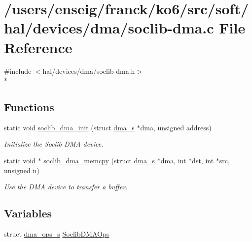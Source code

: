 \hypertarget{soclib-dma_8c}{\section{/users/enseig/franck/ko6/src/soft/hal/devices/dma/soclib-\/dma.c File Reference}
\label{soclib-dma_8c}
}
{\ttfamily \#include $<$hal/devices/dma/soclib-\/dma.\-h$>$}\\*
\subsection*{Functions}
\begin{DoxyCompactItemize}
\item 
static void \hyperlink{soclib-dma_8c_a09eaa847325bb3b2a4962aba32aafe5f}{soclib\-\_\-dma\-\_\-init} (struct \hyperlink{structdma__s}{dma\-\_\-s} $\ast$dma, unsigned address)
\begin{DoxyCompactList}\small\item\em Initialize the Soclib D\-M\-A device. \end{DoxyCompactList}\item 
static void $\ast$ \hyperlink{soclib-dma_8c_ab9abafb825a0f65decf1fef1cc920d40}{soclib\-\_\-dma\-\_\-memcpy} (struct \hyperlink{structdma__s}{dma\-\_\-s} $\ast$dma, int $\ast$dst, int $\ast$src, unsigned n)
\begin{DoxyCompactList}\small\item\em Use the D\-M\-A device to transfer a buffer. \end{DoxyCompactList}\end{DoxyCompactItemize}
\subsection*{Variables}
\begin{DoxyCompactItemize}
\item 
struct \hyperlink{structdma__ops__s}{dma\-\_\-ops\-\_\-s} \hyperlink{soclib-dma_8c_a80351df0b0525153b84f567f1d5c77d1}{Soclib\-D\-M\-A\-Ops}
\end{DoxyCompactItemize}



